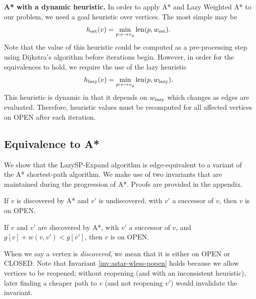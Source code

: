 \textbf{A* with a dynamic heuristic.}
In order to apply A* and Lazy Weighted A* to our problem,
we need a goal heuristic over vertices.
The most simple may be
\begin{equation}
   h_{\mbox{\scriptsize est}}(v) = \min_{p : v \rightarrow v_g} \mbox{len}(p, w_{\mbox{\scriptsize est}}).
   \label{eqn:h_est}
\end{equation}
Note that the value of this heuristic could be computed as a
pre-processing step using Dijkstra's algorithm \citep{dijkstra1959anote}
before iterations begin.
However,
in order for the equivalences to hold,
we require the use of the lazy heuristic
\begin{equation}
   h_{\mbox{\scriptsize lazy}}(v) = \min_{p : v \rightarrow v_g} \mbox{len}(p, w_{\mbox{\scriptsize lazy}}).
   \label{eqn:h_lazy}
\end{equation}
This heuristic is dynamic in that it depends on $w_{\mbox{\scriptsize lazy}}$
which changes as edges are evaluated.
Therefore,
heuristic values must be recomputed for all affected vertices on OPEN
after each iteration.

\subsection{Equivalence to A*}

We show that the LazySP-Expand algorithm
is edge-equivalent to a variant of the A*
shortest-path algorithm.
We make use of two invariants that are maintained during the
progression of A*.
Proofs are provided in the appendix.
\begin{invariant}
If $v$ is discovered by A* and $v'$ is undiscovered,
with $v'$ a successor of $v$,
then $v$ is on OPEN.%
\label{inv:astar-cundisc-popen}%
\end{invariant}
\begin{invariant}
If $v$ and $v'$ are discovered by A*,
with $v'$ a successor of $v$,
and $g[v] + w(v,v') < g[v']$,
then $v$ is on OPEN.%
\label{inv:astar-wless-popen}%
\end{invariant}
When we say a vertex is \emph{discovered},
we mean that it is either on OPEN or CLOSED.
Note that Invariant \ref{inv:astar-wless-popen} holds
because we allow vertices to be reopened;
without reopening (and with an inconsistent heuristic),
later finding a cheaper path to $v$ (and not reopening $v'$)
would invalidate the invariant.

